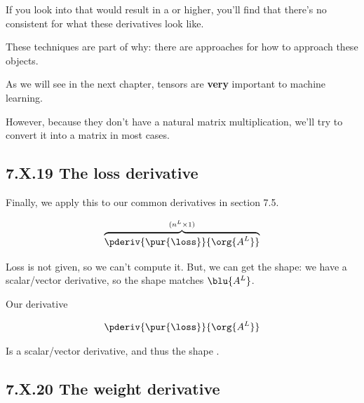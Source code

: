         \begin{clarification}
            If you look into  that would result in a  or higher, you'll find that there's no consistent  for what these derivatives look like.
            
            These techniques are part of why: there are  approaches for how to approach these objects.
        \end{clarification}
        
        As we will see in the next chapter, tensors are \textbf{very} important to machine learning. 
        
        However, because they don't have a natural matrix multiplication, we'll try to convert it into a matrix in most cases.
    
    \secdiv
        
    \subsection*{7.X.19 \quad The loss derivative}
    
        Finally, we apply this to our common derivatives in section 7.5.
        
        \begin{equation}
            \overbrace{
                \pderiv {\pur{\loss}}{\org{A^L}}
            }^{(n^{L} \times 1)}
        \end{equation}
        
        Loss is not given, so we can't compute it. But, we can get the shape: we have a scalar/vector derivative, so the shape matches $\blu{A^L}$.\\
        
        \begin{notation}
            Our derivative
            
            \begin{equation}
                \pderiv {\pur{\loss}}{\org{A^L}}
            \end{equation}
        
            Is a scalar/vector derivative, and thus the shape .
        \end{notation}
            
    \secdiv
            
    \subsection*{7.X.20 \quad The weight derivative}
        
